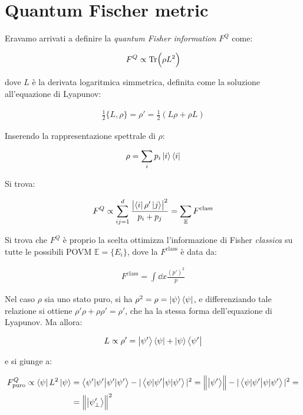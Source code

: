 \documentclass[main_zanardi.tex]{subfiles}
\begin{document}
\section{Quantum Fischer metric}

Eravamo arrivati a definire la \textit{quantum Fisher information} \(F^Q\) come:

\begin{align*}
F^Q \propto \Tr (\rho L^2)
\end{align*}

dove \(L\) è la derivata logaritmica simmetrica, definita come la soluzione all'equazione di Lyapunov:

\begin{align*}
\frac{1}{2}\{ L,\rho\} = \rho' = \frac{1}{2}(L\rho + \rho L)
\end{align*}

Inserendo la rappresentazione spettrale di $\rho$:

\begin{align*}
\rho = \sum_i p_i \ket{i}\bra{i}
\end{align*}

Si trova:

\begin{align*}
F^Q \propto \sum_{ij=1}^d \frac{\abs{\bra{i}\rho'\ket{j}}^2}{p_i + p_j} = \sum_{\mathbb{E}} F^{\text{class}}
\end{align*}

Si trova che $F^Q$ è proprio la scelta ottimizza l'informazione di Fisher \textit{classica} su tutte le possibili POVM $\mathbb{E}=\{E_i\}$, dove la $F^{\mathrm{class}}$ è data da:

\begin{align*}
F^{\text{class}} = \int \dd{x} \frac{(p')^2}{p}
\end{align*}

Nel caso $\rho$ sia uno stato puro, si ha $\rho^2 = \rho = \ket{\psi}\bra{\psi}$, e differenziando tale relazione si ottiene $\rho'\rho + \rho \rho' = \rho'$, che ha la stessa forma dell'equazione di Lyapunov. Ma allora:

\begin{align*}
L \propto \rho' = \ket{\psi'}\bra{\psi} + \ket{\psi}\bra{\psi'}
\end{align*}

e si giunge a:

\begin{align*}
F^{Q}_{\mathrm{puro}} \propto \bra{\psi}L^2 \ket{\psi} &= \braket{\psi'|\psi'} - |\braket{\psi|\psi'}|^2 = \norm{\ket{\psi'}}
-|\braket{\psi|\psi'}|^2 =\\
&= \norm{\ket{\psi_\perp'}}^2
\end{align*}
\end{document}
